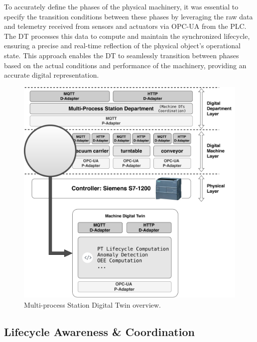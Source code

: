 To accurately define the phases of the physical machinery, it was essential to specify the transition conditions between these phases by leveraging the raw data and telemetry received from sensors and actuators via OPC-UA from the PLC. The DT processes this data to compute and maintain the synchronized lifecycle, ensuring a precise and real-time reflection of the physical object's operational state. This approach enables the DT to seamlessly transition between phases based on the actual conditions and performance of the machinery, providing an accurate digital representation.

\begin{figure}[ht]
    \setlength{\belowcaptionskip}{-13pt}
    \centering
    \includegraphics[width=\columnwidth]{figures/dt-lifecycle/mps_dt_structure_2.pdf}
    \caption{Multi-process Station Digital Twin overview.}
    \label{fig:multiprocess-station-dt-structure}
\end{figure}

\subsection{Lifecycle Awareness \& Coordination}

